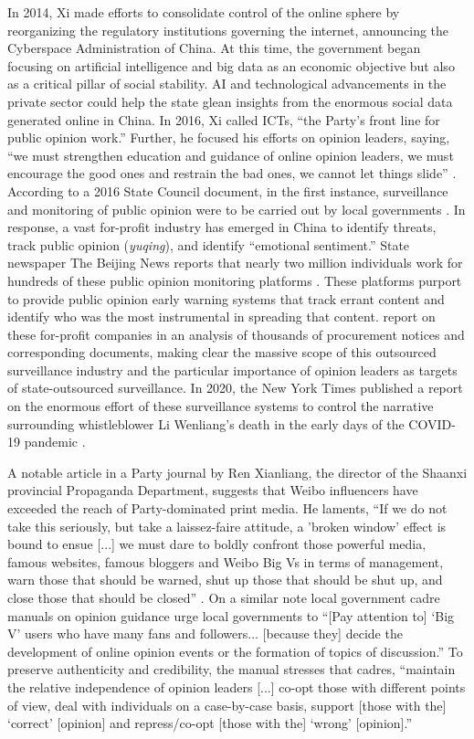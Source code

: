 \documentclass[11pt]{article}
\begin{document}
In 2014, Xi made efforts to consolidate control of the online sphere by reorganizing the regulatory institutions governing the internet, announcing the Cyberspace Administration of China. At this time, the government began focusing on artificial intelligence and big data as an economic objective but also as a critical pillar of social stability. AI and technological advancements in the private sector could help the state glean insights from the enormous social data generated online in China. In 2016, Xi called ICTs, ``the Party's front line for public opinion work.'' Further, he focused his efforts on opinion leaders, saying, ``we must strengthen education and guidance of online opinion leaders, we must encourage the good ones and restrain the bad ones, we cannot let things slide'' \citep{creemers2017cyber}. According to a 2016 State Council document, in the first instance, surveillance and monitoring of public opinion were to be carried out by local governments \citep{statecouncil2016}. In response, a vast for-profit industry has emerged in China to identify threats, track public opinion ({\it yuqing}), and identify ``emotional sentiment.'' State newspaper The Beijing News reports that nearly two million individuals work for hundreds of these public opinion monitoring platforms \citep{bjn2014}. These platforms purport to provide public opinion early warning systems that track errant content and identify who was the most instrumental in spreading that content. \cite{batke2020message} report on these for-profit companies in an analysis of thousands of procurement notices and corresponding documents, making clear the massive scope of this outsourced surveillance industry and the particular importance of opinion leaders as targets of state-outsourced surveillance. In 2020, the New York Times published a report on the enormous effort of these surveillance systems to control the narrative surrounding whistleblower Li Wenliang's death in the early days of the COVID-19 pandemic \citep{zhong2020no}.

A notable article in a Party journal by Ren Xianliang, the director of the Shaanxi provincial Propaganda Department, suggests that Weibo influencers have exceeded the reach of Party-dominated print media. He laments, ``If we do not take this seriously, but take a laissez-faire attitude, a 'broken window' effect is bound to ensue [...] we must dare to boldly confront those powerful media, famous websites, famous bloggers and Weibo Big Vs in terms of management, warn those that should be warned, shut up those that should be shut up, and close those that should be closed'' \citep{creemers2017cyber}. On a similar note local government cadre manuals on opinion guidance urge local governments to ``[Pay attention to] ‘Big V’ users who have many fans and followers... [because they] decide the development of online opinion events or the formation of topics of discussion.'' To preserve authenticity and credibility, the manual stresses that cadres, ``maintain the relative independence of opinion leaders [...] co-opt those with different points of view, deal with individuals on a case-by-case basis, support [those with the] ‘correct’ [opinion] and repress/co-opt [those with the] ‘wrong’ [opinion].''
\end{document}
